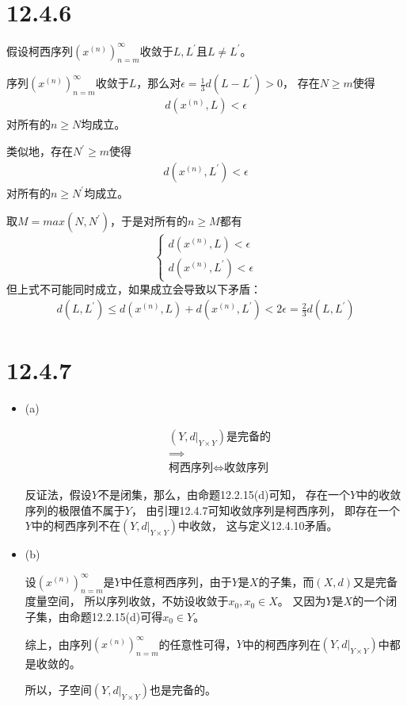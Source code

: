 \documentclass{article}
\begin{document}
\section*{12.4.6}

假设柯西序列$(x^{(n)})_{n = m}^\infty$收敛于$L,L^\prime$且$L \neq L^\prime$。

序列$(x^{(n)})_{n = m}^\infty$收敛于$L$，那么对$\epsilon = \frac{1}{3}d(L-L^\prime) > 0$，
存在$N \geq m$使得
\begin{align*}
  d(x^{(n)}, L) < \epsilon
\end{align*}
对所有的$n \geq N$均成立。

类似地，存在$N^\prime \geq m$使得
\begin{align*}
  d(x^{(n)}, L^\prime) < \epsilon
\end{align*}
对所有的$n \geq N^\prime$均成立。

取$M = max(N, N^\prime)$，于是对所有的$n \geq M$都有
\begin{equation*}
  \begin{cases*}
    d(x^{(n)}, L) < \epsilon \\
    d(x^{(n)}, L^\prime) < \epsilon
  \end{cases*}
\end{equation*}
但上式不可能同时成立，如果成立会导致以下矛盾：
\begin{align*}
  d(L, L^\prime) \leq d(x^{(n)}, L) + d(x^{(n)}, L^\prime) < 2\epsilon = \frac{2}{3}d(L, L^\prime)
\end{align*}

\section*{12.4.7}

\begin{itemize}
  \item (a)

        \begin{align*}
           & (Y, d|_{Y \times Y}) \text{是完备的}        \\
           & \implies                                \\
           & \text{柯西序列} \Leftrightarrow \text{收敛序列}
        \end{align*}

        反证法，假设$Y$不是闭集，那么，由命题12.2.15(d)可知，
        存在一个$Y$中的收敛序列的极限值不属于$Y$，
        由引理12.4.7可知收敛序列是柯西序列，
        即存在一个$Y$中的柯西序列不在$(Y, d|_{Y \times Y})$中收敛，
        这与定义12.4.10矛盾。

  \item (b)

        设$(x^{(n)})_{n=m}^\infty$是$Y$中任意柯西序列，由于$Y$是$X$的子集，而$(X,d)$又是完备度量空间，
        所以序列收敛，不妨设收敛于$x_0, x_0 \in X$。
        又因为$Y$是$X$的一个闭子集，由命题12.2.15(d)可得$x_0 \in Y$。

        综上，由序列$(x^{(n)})_{n=m}^\infty$的任意性可得，$Y$中的柯西序列在$(Y, d|_{Y \times Y})$中都是收敛的。

        所以，子空间$(Y, d|_{Y \times Y})$也是完备的。
\end{itemize}
\end{document}

